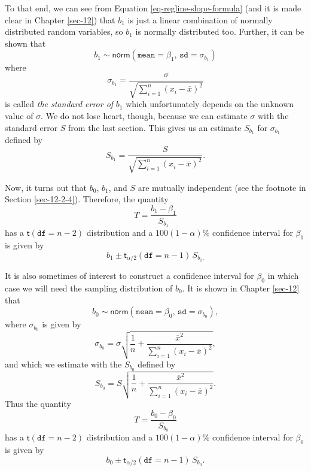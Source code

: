 \documentclass[captions=tableheading]{scrbook}
\begin{document}
To that end, we can see from Equation \ref{eq-regline-slope-formula} (and it is made clear in Chapter \ref{sec-12}) that \(b_{1}\) is just a linear combination of normally distributed random variables, so \(b_{1}\) is normally distributed too. Further, it can be shown that
\begin{equation}
b_{1}\sim\mathsf{norm}\left(\mathtt{mean}=\beta_{1},\,\mathtt{sd}=\sigma_{b_{1}}\right)
\end{equation}
where
\begin{equation}
\sigma_{b_{1}}=\frac{\sigma}{\sqrt{\sum_{i=1}^{n}(x_{i}-\overline{x})^{2}}}
\end{equation}
is called \emph{the standard error of} \(b_{1}\) which unfortunately depends on the unknown value of \(\sigma\). We do not lose heart, though, because we can estimate \(\sigma\) with the standard error \(S\) from the last section. This gives us an estimate \(S_{b_{1}}\) for \(\sigma_{b_{1}}\) defined by
\begin{equation}
S_{b_{1}}=\frac{S}{\sqrt{\sum_{i=1}^{n}(x_{i}-\overline{x})^{2}}}.
\end{equation}

Now, it turns out that \(b_{0}\), \(b_{1}\), and \(S\) are mutually independent (see the footnote in Section \ref{sec-12-2-4}). Therefore, the quantity
\begin{equation}
T=\frac{b_{1}-\beta_{1}}{S_{b_{1}}}
\end{equation}
has a \(\mathsf{t}(\mathtt{df}=n-2)\) distribution and a \(100(1 - \alpha)\% \) confidence interval for \(\beta_{1}\) is given by 
\begin{equation}
b_{1}\pm\mathsf{t}_{\alpha/2}(\mathtt{df}=n-1)\, S_{b_{1}.}
\end{equation}

It is also sometimes of interest to construct a confidence interval for \(\beta_{0}\) in which case we will need the sampling distribution of \(b_{0}\). It is shown in Chapter \ref{sec-12} that
\begin{equation}
b_{0}\sim\mathsf{norm}\left(\mathtt{mean}=\beta_{0},\,\mathtt{sd}=\sigma_{b_{0}}\right),
\end{equation}
where \(\sigma_{b_{0}}\) is given by
\begin{equation}
\sigma_{b_{0}}=\sigma\sqrt{\frac{1}{n}+\frac{\overline{x}^{2}}{\sum_{i=1}^{n}(x_{i}-\overline{x})^{2}}},
\end{equation}
and which we estimate with the \(S_{b_{0}}\) defined by
\begin{equation}
S_{b_{0}}=S\sqrt{\frac{1}{n}+\frac{\overline{x}^{2}}{\sum_{i=1}^{n}(x_{i}-\overline{x})^{2}}}.
\end{equation}
Thus the quantity
\begin{equation}
T=\frac{b_{0}-\beta_{0}}{S_{b_{0}}}
\end{equation}
has a \(\mathsf{t}(\mathtt{df}=n-2)\) distribution and a \(100(1-\alpha)\%\) confidence interval for \(\beta_{0}\) is given by
\begin{equation}
b_{0}\pm\mathsf{t}_{\alpha/2}(\mathtt{df}=n-1)\, S_{b_{0}}.
\end{equation}
\end{document}
